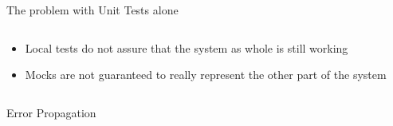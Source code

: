 \begin{frame}{The problem with Unit Tests alone}
  \begin{columns}
    \begin{column}{0.5\textwidth}
      \begin{itemize}
        \item Local tests do not assure that the system as whole is still working
        \item Mocks are not guaranteed to really represent the other part of the system
      \end{itemize}
    \end{column}
    \begin{column}{0.5\textwidth}
      \begin{center}
      \end{center}
    \end{column}
    \end{columns}
\end{frame}

\begin{frame}{Error Propagation}
  \begin{center}
  \end{center}
\end{frame}

